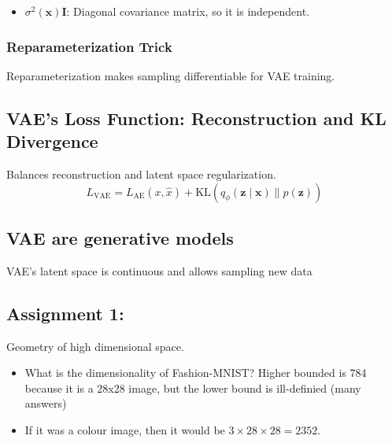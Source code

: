 \documentclass{article}
\begin{document}
\begin{notes}
    \begin{itemize}
        \item $\sigma^2(\mathbf{x}) \mathbf{I}$: Diagonal covariance matrix, so it is independent.
    \end{itemize}
\end{notes}

\subsubsection{Reparameterization Trick}
\begin{definition}
    Reparameterization makes sampling differentiable for VAE training.
\end{definition}

\subsection{VAE's Loss Function: Reconstruction and KL Divergence}
\begin{definition}
    Balances reconstruction and latent space regularization.
    \begin{equation}
        L_{\text{VAE}} = L_{\text{AE}} (x, \hat{x}) + \text{KL} (q_\phi (\mathbf{z} \mid \mathbf{x}) \parallel p(\mathbf{z}))
    \end{equation}
\end{definition}

\subsection{VAE are generative models}
\begin{definition}
    VAE's latent space is continuous and allows sampling new data
\end{definition}

\subsection{Assignment 1:}
\begin{definition}
    Geometry of high dimensional space. 
\end{definition}

\begin{notes}
    \begin{itemize}
        \item What is the dimensionality of Fashion-MNIST? Higher bounded is 784 because it is a 28x28 image, but the lower bound is ill-definied (many answers)
        \item If it was a colour image, then it would be $3 \times 28 \times 28 = 2352$.
    \end{itemize}
\end{notes}
\end{document}
